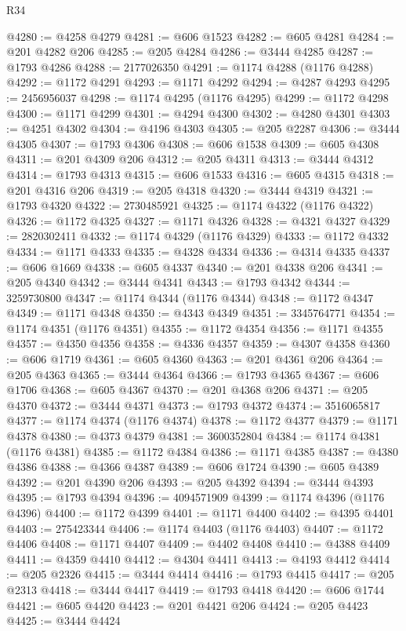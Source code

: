 \begin{lexlean}{R34}
\begin{coremodule}
@4280 := @4258 @4279
@4281 := @606 @1523
@4282 := @605 @4281
@4284 := @201 @4282 @206
@4285 := @205 @4284
@4286 := @3444 @4285
@4287 := @1793 @4286
@4288 := 2177026350
@4291 := @1174 @4288 (@1176 @4288)
@4292 := @1172 @4291
@4293 := @1171 @4292
@4294 := @4287 @4293
@4295 := 2456956037
@4298 := @1174 @4295 (@1176 @4295)
@4299 := @1172 @4298
@4300 := @1171 @4299
@4301 := @4294 @4300
@4302 := @4280 @4301
@4303 := @4251 @4302
@4304 := @4196 @4303
@4305 := @205 @2287
@4306 := @3444 @4305
@4307 := @1793 @4306
@4308 := @606 @1538
@4309 := @605 @4308
@4311 := @201 @4309 @206
@4312 := @205 @4311
@4313 := @3444 @4312
@4314 := @1793 @4313
@4315 := @606 @1533
@4316 := @605 @4315
@4318 := @201 @4316 @206
@4319 := @205 @4318
@4320 := @3444 @4319
@4321 := @1793 @4320
@4322 := 2730485921
@4325 := @1174 @4322 (@1176 @4322)
@4326 := @1172 @4325
@4327 := @1171 @4326
@4328 := @4321 @4327
@4329 := 2820302411
@4332 := @1174 @4329 (@1176 @4329)
@4333 := @1172 @4332
@4334 := @1171 @4333
@4335 := @4328 @4334
@4336 := @4314 @4335
@4337 := @606 @1669
@4338 := @605 @4337
@4340 := @201 @4338 @206
@4341 := @205 @4340
@4342 := @3444 @4341
@4343 := @1793 @4342
@4344 := 3259730800
@4347 := @1174 @4344 (@1176 @4344)
@4348 := @1172 @4347
@4349 := @1171 @4348
@4350 := @4343 @4349
@4351 := 3345764771
@4354 := @1174 @4351 (@1176 @4351)
@4355 := @1172 @4354
@4356 := @1171 @4355
@4357 := @4350 @4356
@4358 := @4336 @4357
@4359 := @4307 @4358
@4360 := @606 @1719
@4361 := @605 @4360
@4363 := @201 @4361 @206
@4364 := @205 @4363
@4365 := @3444 @4364
@4366 := @1793 @4365
@4367 := @606 @1706
@4368 := @605 @4367
@4370 := @201 @4368 @206
@4371 := @205 @4370
@4372 := @3444 @4371
@4373 := @1793 @4372
@4374 := 3516065817
@4377 := @1174 @4374 (@1176 @4374)
@4378 := @1172 @4377
@4379 := @1171 @4378
@4380 := @4373 @4379
@4381 := 3600352804
@4384 := @1174 @4381 (@1176 @4381)
@4385 := @1172 @4384
@4386 := @1171 @4385
@4387 := @4380 @4386
@4388 := @4366 @4387
@4389 := @606 @1724
@4390 := @605 @4389
@4392 := @201 @4390 @206
@4393 := @205 @4392
@4394 := @3444 @4393
@4395 := @1793 @4394
@4396 := 4094571909
@4399 := @1174 @4396 (@1176 @4396)
@4400 := @1172 @4399
@4401 := @1171 @4400
@4402 := @4395 @4401
@4403 := 275423344
@4406 := @1174 @4403 (@1176 @4403)
@4407 := @1172 @4406
@4408 := @1171 @4407
@4409 := @4402 @4408
@4410 := @4388 @4409
@4411 := @4359 @4410
@4412 := @4304 @4411
@4413 := @4193 @4412
@4414 := @205 @2326
@4415 := @3444 @4414
@4416 := @1793 @4415
@4417 := @205 @2313
@4418 := @3444 @4417
@4419 := @1793 @4418
@4420 := @606 @1744
@4421 := @605 @4420
@4423 := @201 @4421 @206
@4424 := @205 @4423
@4425 := @3444 @4424

\end{coremodule}
\end{lexlean}
